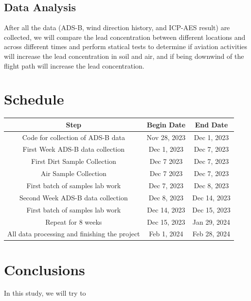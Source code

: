 \documentclass[12pt]{article}
\begin{document}
\subsection{Data Analysis}
After all the data (ADS-B, wind direction history, and ICP-AES result) are collected, we will compare the lead concentration between different locations and across different times and perform statical tests to determine if aviation activities will increase the lead concentration in soil and air, and if being downwind of the flight path will increase the lead concentration. 
\section{Schedule}
\begin{center}
\begin{tabular}{|c|c|c|}
 \hline
 \textbf{Step} & \textbf{Begin Date} & \textbf{End Date} \\
 \hline \hline
Code for collection of ADS-B data & Nov 28, 2023 & Dec 1, 2023 \\
\hline
First Week ADS-B data collection & Dec 1, 2023 & Dec 7, 2023 \\
\hline
First Dirt Sample Collection & Dec 7 2023 & Dec 7, 2023 \\
\hline
Air Sample Collection & Dec 7 2023 & Dec 7, 2023 \\
\hline
First batch of samples lab work & Dec 7, 2023 & Dec 8, 2023 \\ 
\hline
Second Week ADS-B data collection & Dec 8, 2023 & Dec 14, 2023 \\
\hline
First batch of samples lab work & Dec 14, 2023 & Dec 15, 2023 \\ 
\hline
Repeat for 8 weeks & Dec 15, 2023 & Jan 29, 2024\\
\hline
All data processing and finishing the project& Feb 1, 2024 & Feb 28, 2024\\
\hline
\end{tabular}
\end{center}
\section{Conclusions}
In this study, we will try to 
\end{document}
